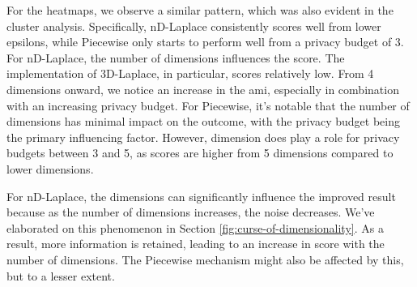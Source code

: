 For the heatmaps, we observe a similar pattern, which was also evident in the cluster analysis. Specifically, nD-Laplace consistently scores well from lower epsilons, while Piecewise only starts to perform well from a privacy budget of 3.
For nD-Laplace, the number of dimensions influences the score. The implementation of 3D-Laplace, in particular, scores relatively low. From 4 dimensions onward, we notice an increase in the \gls{ami}, especially in combination with an increasing privacy budget.
For Piecewise, it's notable that the number of dimensions has minimal impact on the outcome, with the privacy budget being the primary influencing factor. However, dimension does play a role for privacy budgets between 3 and 5, as scores are higher from 5 dimensions compared to lower dimensions.

For nD-Laplace, the dimensions can significantly influence the improved result because as the number of dimensions increases, the noise decreases. We've elaborated on this phenomenon in Section \ref{fig:curse-of-dimensionality}. As a result, more information is retained, leading to an increase in score with the number of dimensions. The Piecewise mechanism might also be affected by this, but to a lesser extent.

\newpage

